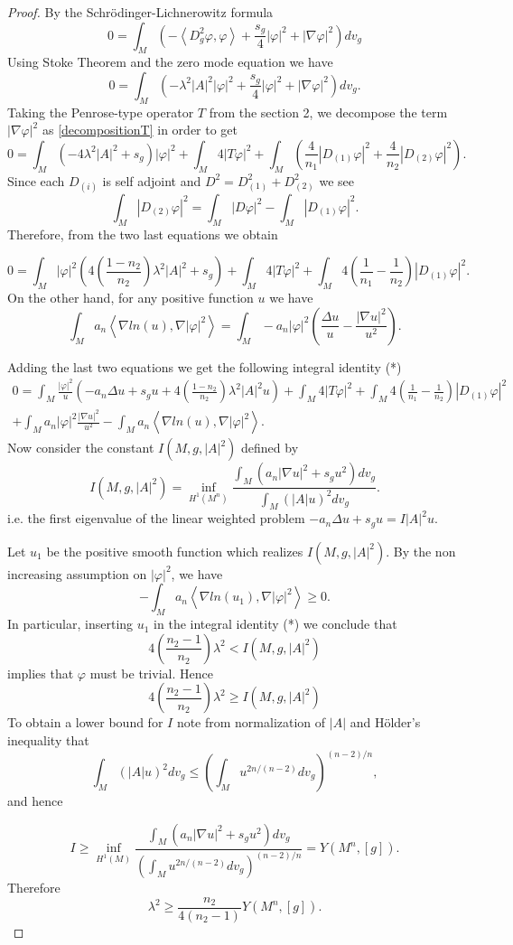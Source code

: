 \documentclass[10pt,a4paper]{amsart}
\begin{document}
\begin{proof}
By the Schrödinger-Lichnerowitz formula $$0=\int_M\left(- \left\langle D^2_g\varphi,\varphi\right\rangle+\frac{s_g}{4}|\varphi|^2+|\nabla \varphi|^2\right)dv_g$$
Using Stoke Theorem and the zero mode equation we have $$0=\int_M\left(- \lambda^2|A|^2|\varphi|^2+\frac{s_g}{4}|\varphi|^2+|\nabla \varphi|^2\right)dv_g.$$
Taking the Penrose-type operator $T$ from the section 2, we decompose the term $|\nabla\varphi|^2$ as \eqref{decompositionT} in order to get
$$0=\int_M\left( - 4\lambda^2|A|^2+s_g\right)|\varphi|^2+\int_M 4|T\varphi|^2+\int_M\left(\frac{4}{n_1}|D_{(1)}\varphi|^2+\frac{4}{n_2}|D_{(2)}\varphi|^2\right).$$
Since each $D_{(i)}$ is self adjoint and $D^2=D^2_{(1)}+D^2_{(2)}$ we see $$\int_M|D_{(2)}\varphi|^2=\int_M|D\varphi|^2-\int_M|D_{(1)}\varphi|^2.$$
Therefore, from the two last equations we obtain
 
$$0=\int_M |\varphi|^2\left(4\left(\frac{1-n_2}{n_2}\right)\lambda^2|A|^2+s_g\right)+\int_M 4|T\varphi|^2+\int_M 4\left( \frac{1}{n_1}-\frac{1}{n_2}\right)|D_{(1)}\varphi|^2.$$
On the other hand, for any positive function $u$ we have
$$\int_Ma_n\left\langle\nabla ln(u),\nabla |\varphi|^2\right\rangle=\int_M-a_n|\varphi|^2\left(\frac{\Delta u}{u}-\frac{|\nabla u|^2}{u^2}\right).$$

Adding the last two equations we get the following integral identity (*)
\begin{align*}
0=\int_M\frac{|\varphi|^2}{u}\left(-a_n\Delta u+s_gu+4\left(\frac{1-n_2}{n_2}\right)\lambda^2|A|^2u\right)+\int_M 4|T\varphi|^2+\int_M 4\left( \frac{1}{n_1}-\frac{1}{n_2}\right)|D_{(1)}\varphi|^2\\
+\int_M a_n|\varphi|^2\frac{|\nabla u|^2}{u^2}-\int_Ma_n\left\langle\nabla ln(u),\nabla |\varphi|^2\right\rangle.
\end{align*}
Now consider the constant $I(M,g,|A|^2)$ defined by $$I(M,g,|A|^2)=\inf_{H^1(M^n)}\frac{\int_M\left( a_n|\nabla u|^2+s_gu^2\right)dv_g}{\int_M (|A|u)^2dv_g}.$$
i.e. the first eigenvalue of the linear weighted problem $-a_n\Delta u+s_gu=I|A|^2u.$

Let $u_1$ be the positive smooth function which realizes $I(M,g,|A|^2)$. By the non increasing assumption  on $|\varphi|^2$, we have $$-\int_Ma_n\left\langle\nabla ln(u_1),\nabla |\varphi|^2\right\rangle\geq 0.$$
In particular, inserting $u_1$ in the integral identity (*) we conclude that $$4\left(\frac{n_2-1}{n_2}\right)\lambda^2< I(M,g,|A|^2)$$
implies that $\varphi$ must be trivial.
Hence  $$4\left(\frac{n_2-1}{n_2}\right)\lambda^2\geq I(M,g,|A|^2)$$
To obtain a lower bound for $I$ note from normalization of $|A|$ and Hölder's inequality that $$\int_M (|A|u)^2dv_g\leq \left(\int_Mu^{2n/(n-2)}dv_g\right)^{(n-2)/n},$$
and hence

 $$I\geq \inf_{H^1(M)} \frac{\int_M\left( a_n|\nabla u|^2+s_gu^2\right)dv_g}{\left(\int_Mu^{2n/(n-2)}dv_g\right)^{(n-2)/n}}=Y(M^n,[g]). $$ 
Therefore $$\lambda^2\geq \frac{n_2}{4(n_2-1)}Y(M^n,[g]).$$
\end{proof}
\end{document}
